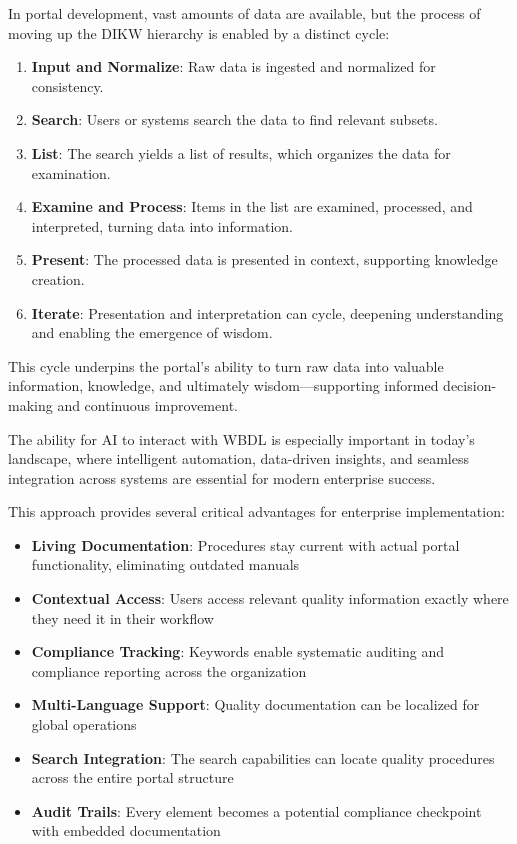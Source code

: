 In portal development, vast amounts of data are available, but the process of moving up the DIKW hierarchy is enabled by a distinct cycle:
\begin{enumerate}
  \item \textbf{Input and Normalize}: Raw data is ingested and normalized for consistency.
  \item \textbf{Search}: Users or systems search the data to find relevant subsets.
  \item \textbf{List}: The search yields a list of results, which organizes the data for examination.
  \item \textbf{Examine and Process}: Items in the list are examined, processed, and interpreted, turning data into information.
  \item \textbf{Present}: The processed data is presented in context, supporting knowledge creation.
  \item \textbf{Iterate}: Presentation and interpretation can cycle, deepening understanding and enabling the emergence of wisdom.
\end{enumerate}
This cycle underpins the portal's ability to turn raw data into valuable information, knowledge, and ultimately wisdom—supporting informed decision-making and continuous improvement.

The ability for AI to interact with WBDL is especially important in today's landscape, where intelligent automation, data-driven insights, and seamless integration across systems are essential for modern enterprise success.

This approach provides several critical advantages for enterprise implementation:

\begin{itemize}
\item \textbf{Living Documentation}: Procedures stay current with actual portal functionality, eliminating outdated manuals
\item \textbf{Contextual Access}: Users access relevant quality information exactly where they need it in their workflow
\item \textbf{Compliance Tracking}: Keywords enable systematic auditing and compliance reporting across the organization
\item \textbf{Multi-Language Support}: Quality documentation can be localized for global operations
\item \textbf{Search Integration}: The \studio{} search capabilities can locate quality procedures across the entire portal structure
\item \textbf{Audit Trails}: Every element becomes a potential compliance checkpoint with embedded documentation
\end{itemize}

